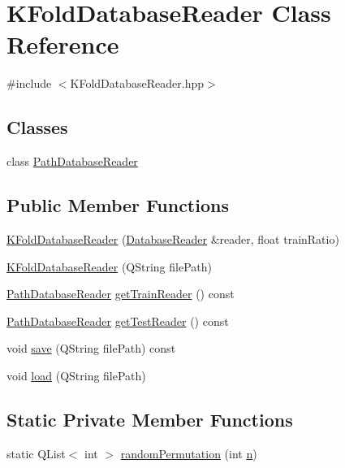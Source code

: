 \hypertarget{class_k_fold_database_reader}{\section{K\+Fold\+Database\+Reader Class Reference}
\label{class_k_fold_database_reader}
}


{\ttfamily \#include $<$K\+Fold\+Database\+Reader.\+hpp$>$}

\subsection*{Classes}
\begin{DoxyCompactItemize}
\item 
class \hyperlink{class_k_fold_database_reader_1_1_path_database_reader}{Path\+Database\+Reader}
\end{DoxyCompactItemize}
\subsection*{Public Member Functions}
\begin{DoxyCompactItemize}
\item 
\hyperlink{class_k_fold_database_reader_a50c775127f0a9decc8d7f275005cd437}{K\+Fold\+Database\+Reader} (\hyperlink{class_database_reader}{Database\+Reader} \&reader, float train\+Ratio)
\item 
\hyperlink{class_k_fold_database_reader_a4abc03af562d6d778b51099921b984c9}{K\+Fold\+Database\+Reader} (Q\+String file\+Path)
\item 
\hyperlink{class_k_fold_database_reader_1_1_path_database_reader}{Path\+Database\+Reader} \hyperlink{class_k_fold_database_reader_a2a94b70899a67487649330c72a545e5a}{get\+Train\+Reader} () const 
\item 
\hyperlink{class_k_fold_database_reader_1_1_path_database_reader}{Path\+Database\+Reader} \hyperlink{class_k_fold_database_reader_a5a39e6986d09d77427d98c2ba7a25131}{get\+Test\+Reader} () const 
\item 
void \hyperlink{class_k_fold_database_reader_a3f0544d79d13bd58015a2d15df5efaa6}{save} (Q\+String file\+Path) const 
\item 
void \hyperlink{class_k_fold_database_reader_ab64118fa23335865825d6b503ef3c5a8}{load} (Q\+String file\+Path)
\end{DoxyCompactItemize}
\subsection*{Static Private Member Functions}
\begin{DoxyCompactItemize}
\item 
static Q\+List$<$ int $>$ \hyperlink{class_k_fold_database_reader_a2f8223aae421c533d260b5d6e65c09e8}{random\+Permutation} (int \hyperlink{print_report_8m_aeab71244afb687f16d8c4f5ee9d6ef0e}{n})
\end{DoxyCompactItemize}
